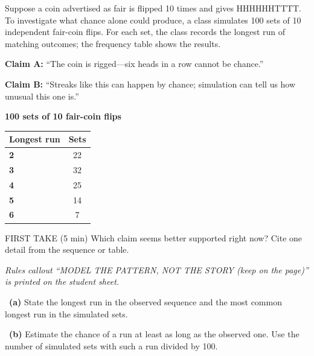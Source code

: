 \documentclass[11pt]{article}
\begin{document}
\clearpage
{}

Suppose a coin advertised as fair is flipped 10 times and gives HHHHHHTTTT. To investigate what chance alone could produce, a class simulates 100 sets of 10 independent fair-coin flips. For each set, the class records the longest run of matching outcomes; the frequency table shows the results.\par\smallskip \textbf{Claim A:} ``The coin is rigged---six heads in a row cannot be chance.''\par \textbf{Claim B:} ``Streaks like this can happen by chance; simulation can tell us how unusual this one is.''\par
\begin{center}
\textbf{100 sets of 10 fair-coin flips}\par\smallskip
\begin{tabular}{|l|c|}
\hline
\textbf{Longest run} & \textbf{Sets} \\ \hline
\textbf{2} & 22 \\ \hline
\textbf{3} & 32 \\ \hline
\textbf{4} & 25 \\ \hline
\textbf{5} & 14 \\ \hline
\textbf{6} & 7 \\ \hline
\end{tabular}
\end{center}
\begin{firsttakebox}{FIRST TAKE (5 min)}
Which claim seems better supported right now? Cite one detail from the sequence or table.\par
{}
\end{firsttakebox}

\textit{Rules callout ``MODEL THE PATTERN, NOT THE STORY (keep on the page)'' is printed on the student sheet.}\par\medskip

~\textbf{(a)} State the longest run in the observed sequence and the most common longest run in the simulated sets.\par
{}

~\textbf{(b)} Estimate the chance of a run at least as long as the observed one. Use the number of simulated sets with such a run divided by 100.\par
{}
\end{document}
